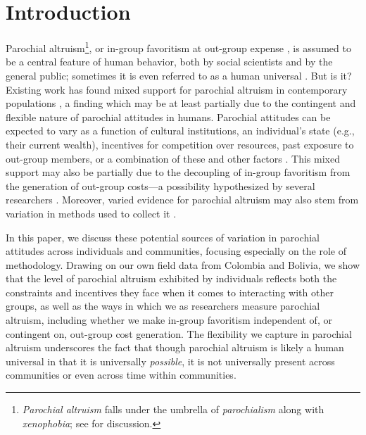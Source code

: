 \documentclass[bibauthoryear]{aa}
\begin{document}


\section{Introduction}\label{firstbit}
Parochial altruism\footnote{\emph{Parochial altruism} falls under the umbrella of \emph{parochialism} along with \emph{xenophobia}; see \citet{hruschka2013economic} for discussion.}, or in-group favoritism at out-group expense \citep{choi2007coevolution}, is assumed to be a central feature of human behavior, both by social scientists and by the general public; sometimes it is even referred to as a human universal \citep{greene2013moral}. But is it? Existing work has found mixed support for parochial altruism in contemporary populations \citep{Rusch2014}, a finding which may be at least partially due to the contingent and flexible nature of parochial attitudes in humans. Parochial attitudes can be expected to vary as a function of cultural institutions, an individual's state (e.g., their current wealth), incentives for competition over resources,  past exposure to out-group members, or a combination of these and other factors \citep{pisor2019evolution}. This mixed support may also be partially due to the decoupling of in-group favoritism from the generation of out-group costs---a possibility hypothesized by several researchers \citep{purzycki2019identity, hruschka2013economic, yamagishi2016parochial, brewer2006evolutionary, schaub2017threat, cashdan2001ethnocentrism}. Moreover, varied evidence for parochial altruism may also stem from variation in methods used to collect it \citep{Pisor2020}.



In this paper, we discuss these potential sources of variation in parochial attitudes across individuals and communities, focusing especially on the role of methodology. Drawing on our own field data from Colombia and Bolivia, we show that the level of  parochial altruism  exhibited by individuals reflects both the constraints and incentives they face when it comes to interacting with other groups, as well as the ways in which we as researchers measure parochial altruism, including whether we make in-group favoritism independent of, or contingent on, out-group cost generation. The flexibility we capture in parochial altruism underscores the fact that though parochial altruism is likely a human universal in that it is universally \textit{possible}, it is not universally present across communities or even across time within communities.
\end{document}
